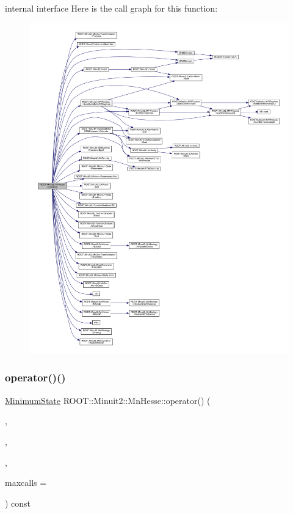 internal interface Here is the call graph for this function\+:
\nopagebreak
\begin{figure}[H]
\begin{center}
\leavevmode
\includegraphics[width=350pt]{d1/d02/classROOT_1_1Minuit2_1_1MnHesse_a4130de0190695811a4606f8ab229482d_cgraph}
\end{center}
\end{figure}
\mbox{\label{classROOT_1_1Minuit2_1_1MnHesse_a4130de0190695811a4606f8ab229482d}} 
\subsubsection{\texorpdfstring{operator()()}{operator()()}\hspace{0.1cm}{\footnotesize\ttfamily [24/24]}}
{\footnotesize\ttfamily \mbox{\hyperlink{classROOT_1_1Minuit2_1_1MinimumState}{Minimum\+State}} R\+O\+O\+T\+::\+Minuit2\+::\+Mn\+Hesse\+::operator() (\begin{DoxyParamCaption}\item[{const \mbox{\hyperlink{classROOT_1_1Minuit2_1_1MnFcn}{Mn\+Fcn}} \&}]{,  }\item[{const \mbox{\hyperlink{classROOT_1_1Minuit2_1_1MinimumState}{Minimum\+State}} \&}]{,  }\item[{const \mbox{\hyperlink{classROOT_1_1Minuit2_1_1MnUserTransformation}{Mn\+User\+Transformation}} \&}]{,  }\item[{unsigned int}]{maxcalls = {} }\end{DoxyParamCaption}) const}

